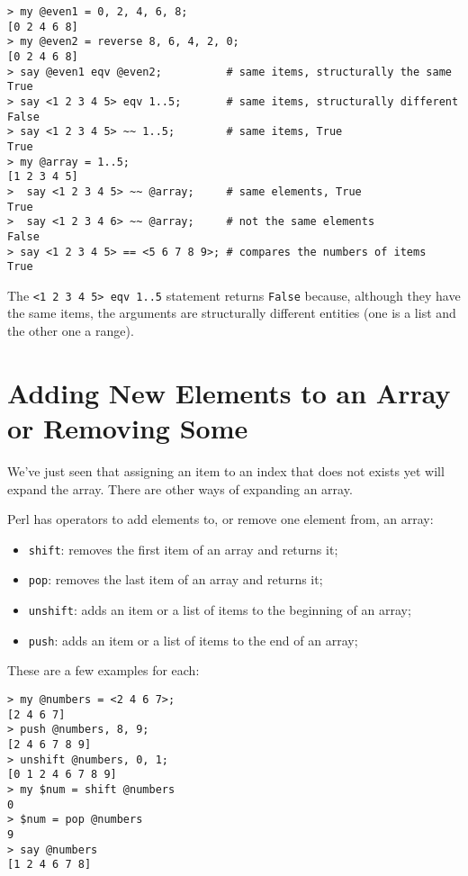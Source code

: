 \begin{verbatim}
> my @even1 = 0, 2, 4, 6, 8;
[0 2 4 6 8]
> my @even2 = reverse 8, 6, 4, 2, 0;
[0 2 4 6 8]
> say @even1 eqv @even2;          # same items, structurally the same
True
> say <1 2 3 4 5> eqv 1..5;       # same items, structurally different
False
> say <1 2 3 4 5> ~~ 1..5;        # same items, True
True
> my @array = 1..5;               
[1 2 3 4 5]
>  say <1 2 3 4 5> ~~ @array;     # same elements, True
True
>  say <1 2 3 4 6> ~~ @array;     # not the same elements
False
> say <1 2 3 4 5> == <5 6 7 8 9>; # compares the numbers of items
True
\end{verbatim}

The \verb'<1 2 3 4 5> eqv 1..5' statement returns \verb'False' because, 
although they have the same items, the arguments are structurally 
different entities (one is a list and the other one a range).

\section{Adding New Elements to an Array or Removing Some}

We've just seen that assigning an item to an index that does 
not exists yet will expand the array. There are other 
ways of expanding an array.

Perl has operators to add elements to, or remove one element 
from, an array:

\begin{itemize}
\item {\tt shift}: removes the first item of an array and returns it;
\item {\tt pop}: removes the last item of an array and returns it;
\item {\tt unshift}: adds an item or a list of items to the 
beginning of an array;
\item {\tt push}: adds an item or a list of items to the 
end of an array;
\end{itemize}

These are a few examples for each:

\begin{verbatim}
> my @numbers = <2 4 6 7>;
[2 4 6 7]
> push @numbers, 8, 9;
[2 4 6 7 8 9]
> unshift @numbers, 0, 1;
[0 1 2 4 6 7 8 9]
> my $num = shift @numbers
0
> $num = pop @numbers
9
> say @numbers
[1 2 4 6 7 8]
\end{verbatim}

